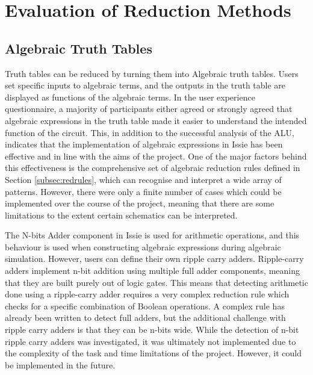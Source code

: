 \section{Evaluation of Reduction Methods}
\subsection{Algebraic Truth Tables}
Truth tables can be reduced by turning them into Algebraic truth tables. Users set specific inputs to algebraic terms, and the outputs in the truth table are displayed as functions of the algebraic terms.
In the user experience questionnaire, a majority of participants either agreed or strongly agreed that algebraic expressions in the truth table made it easier to understand the intended function of the circuit. This, in addition to the successful analysis of the ALU, indicates that the implementation of algebraic expressions in Issie has been effective and in line with the aims of the project. One of the major factors behind this effectiveness is the comprehensive set of algebraic reduction rules defined in Section \ref{subsec:redrules}, which can recognise and interpret a wide array of patterns. However, there were only a finite number of cases which could be implemented over the course of the project, meaning that there are some limitations to the extent certain schematics can be interpreted.

The N-bits Adder component in Issie is used for arithmetic operations, and this behaviour is used when constructing algebraic expressions during algebraic simulation. However, users can define their own ripple carry adders. Ripple-carry adders implement n-bit addition using multiple full adder components, meaning that they are built purely out of logic gates. This means that detecting arithmetic done using a ripple-carry adder requires a very complex reduction rule which checks for a specific combination of Boolean operations. A complex rule has already been written to detect full adders, but the additional challenge with ripple carry adders is that they can be n-bits wide. While the detection of n-bit ripple carry adders was investigated, it was ultimately not implemented due to the complexity of the task and time limitations of the project. However, it could be implemented in the future.

